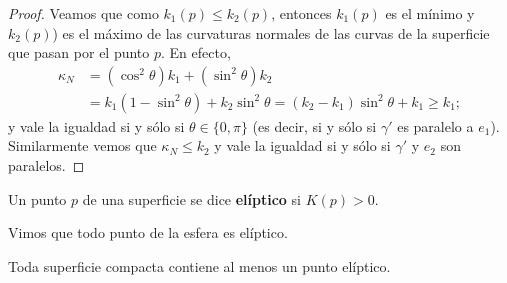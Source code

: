 \begin{proof}
	Veamos que 
	como
	$k_1(p)\leq k_2(p)$, entonces $k_1(p)$ es el mínimo
	y $k_2(p)$) 
	es el máximo de las curvaturas normales de las curvas de la superficie que
	pasan por el punto $p$. En efecto, 
	\begin{align*}
		\kappa_N&=(\cos^2\theta)k_1+(\sin^2\theta)k_2\\
		&=k_1(1-\sin^2\theta)+k_2\sin^2\theta=(k_2-k_1)\sin^2\theta+k_1\geq k_1;
	\end{align*}
	y vale la igualdad si y sólo si $\theta\in\{0,\pi\}$ (es decir, si y sólo si
	$\gamma'$ es paralelo a $e_1$). Similarmente vemos que $\kappa_N\leq k_2$ y vale la
	igualdad si y sólo si $\gamma'$ y $e_2$ son paralelos.
\end{proof}



\begin{definition}
	Un punto $p$ de una superficie se dice \textbf{elíptico} si $K(p)>0$. 
\end{definition}

Vimos que todo punto de la esfera es elíptico. 

\begin{theorem}
	\label{thm:compacta_eliptico}
	Toda superficie compacta contiene al menos un punto elíptico. 
\end{theorem}

